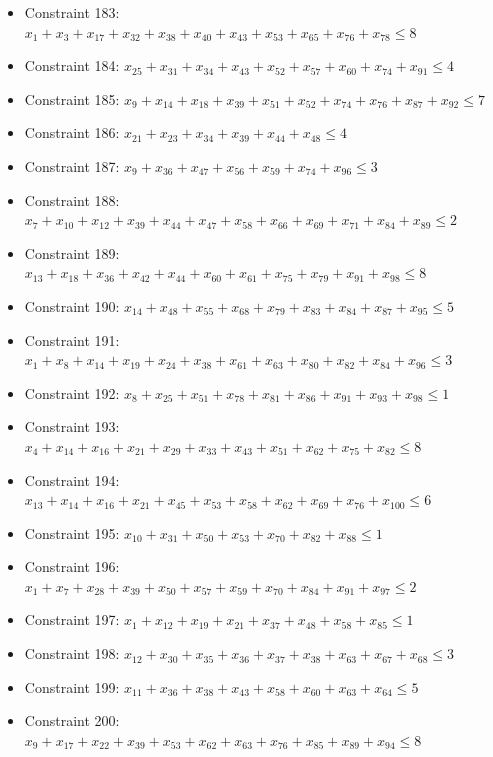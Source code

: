 \documentclass[11pt]{article}
\begin{document}
\begin{itemize}
\item Constraint 183: $x_{1} + x_{3} + x_{17} + x_{32} + x_{38} + x_{40} + x_{43} + x_{53} + x_{65} + x_{76} + x_{78} \le 8$
\item Constraint 184: $x_{25} + x_{31} + x_{34} + x_{43} + x_{52} + x_{57} + x_{60} + x_{74} + x_{91} \le 4$
\item Constraint 185: $x_{9} + x_{14} + x_{18} + x_{39} + x_{51} + x_{52} + x_{74} + x_{76} + x_{87} + x_{92} \le 7$
\item Constraint 186: $x_{21} + x_{23} + x_{34} + x_{39} + x_{44} + x_{48} \le 4$
\item Constraint 187: $x_{9} + x_{36} + x_{47} + x_{56} + x_{59} + x_{74} + x_{96} \le 3$
\item Constraint 188: $x_{7} + x_{10} + x_{12} + x_{39} + x_{44} + x_{47} + x_{58} + x_{66} + x_{69} + x_{71} + x_{84} + x_{89} \le 2$
\item Constraint 189: $x_{13} + x_{18} + x_{36} + x_{42} + x_{44} + x_{60} + x_{61} + x_{75} + x_{79} + x_{91} + x_{98} \le 8$
\item Constraint 190: $x_{14} + x_{48} + x_{55} + x_{68} + x_{79} + x_{83} + x_{84} + x_{87} + x_{95} \le 5$
\item Constraint 191: $x_{1} + x_{8} + x_{14} + x_{19} + x_{24} + x_{38} + x_{61} + x_{63} + x_{80} + x_{82} + x_{84} + x_{96} \le 3$
\item Constraint 192: $x_{8} + x_{25} + x_{51} + x_{78} + x_{81} + x_{86} + x_{91} + x_{93} + x_{98} \le 1$
\item Constraint 193: $x_{4} + x_{14} + x_{16} + x_{21} + x_{29} + x_{33} + x_{43} + x_{51} + x_{62} + x_{75} + x_{82} \le 8$
\item Constraint 194: $x_{13} + x_{14} + x_{16} + x_{21} + x_{45} + x_{53} + x_{58} + x_{62} + x_{69} + x_{76} + x_{100} \le 6$
\item Constraint 195: $x_{10} + x_{31} + x_{50} + x_{53} + x_{70} + x_{82} + x_{88} \le 1$
\item Constraint 196: $x_{1} + x_{7} + x_{28} + x_{39} + x_{50} + x_{57} + x_{59} + x_{70} + x_{84} + x_{91} + x_{97} \le 2$
\item Constraint 197: $x_{1} + x_{12} + x_{19} + x_{21} + x_{37} + x_{48} + x_{58} + x_{85} \le 1$
\item Constraint 198: $x_{12} + x_{30} + x_{35} + x_{36} + x_{37} + x_{38} + x_{63} + x_{67} + x_{68} \le 3$
\item Constraint 199: $x_{11} + x_{36} + x_{38} + x_{43} + x_{58} + x_{60} + x_{63} + x_{64} \le 5$
\item Constraint 200: $x_{9} + x_{17} + x_{22} + x_{39} + x_{53} + x_{62} + x_{63} + x_{76} + x_{85} + x_{89} + x_{94} \le 8$
\end{itemize}
\end{document}
